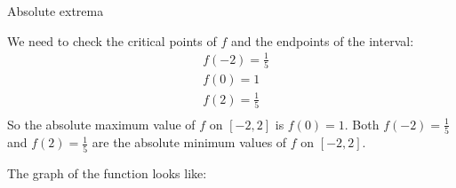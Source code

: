 \documentclass[handout,nooutcomes]{ximera}
\renewenvironment{freeResponse}{
\ifhandout\setbox0\vbox\bgroup\else
\begin{trivlist}\item[\hskip \labelsep\bfseries Solution:\hspace{2ex}]
\fi}
{\ifhandout\egroup\else
\end{trivlist}
\fi}
\begin{document}
\begin{problem}
\begin{enumerate}
	\item  Absolute extrema
	
		\begin{freeResponse}
		We need to check the critical points of $f$ and the endpoints of the interval:
		\begin{align*}
  		& f(-2)=\frac{1}{5} \\ 
 		& f(0)=1 \\ 
 		& f(2)=\frac{1}{5} \\ 
		\end{align*}
		So the absolute maximum value of $f$ on $[-2,2]$ is $f(0)=1$.  Both $f(-2)=\frac{1}{5}$ and $f(2)=\frac{1}{5}$ are the absolute minimum values of $f$ on $[-2,2]$.
		
		The graph of the function looks like:
		
\begin{center}
\begin{image}
\end{image}
\end{center}


		\end{freeResponse}
	
	\end{enumerate}
		
\end{problem}
\end{document}
